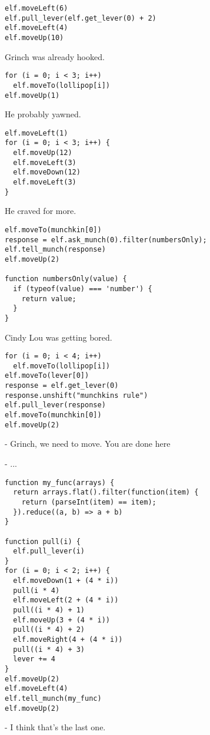 \begin{verbatim}
elf.moveLeft(6)
elf.pull_lever(elf.get_lever(0) + 2)
elf.moveLeft(4)
elf.moveUp(10)
\end{verbatim}

Grinch was already hooked.

\begin{verbatim}
for (i = 0; i < 3; i++)
  elf.moveTo(lollipop[i])
elf.moveUp(1)
\end{verbatim}

He probably yawned.

\begin{verbatim}
elf.moveLeft(1)
for (i = 0; i < 3; i++) {
  elf.moveUp(12)
  elf.moveLeft(3)
  elf.moveDown(12)
  elf.moveLeft(3)
}
\end{verbatim}

He craved for more.

\begin{verbatim}
elf.moveTo(munchkin[0])
response = elf.ask_munch(0).filter(numbersOnly);
elf.tell_munch(response)
elf.moveUp(2)

function numbersOnly(value) {
  if (typeof(value) === 'number') {
    return value;
  }
}
\end{verbatim}

Cindy Lou was getting bored.

\begin{verbatim}
for (i = 0; i < 4; i++)
  elf.moveTo(lollipop[i])
elf.moveTo(lever[0])
response = elf.get_lever(0)
response.unshift("munchkins rule")
elf.pull_lever(response)
elf.moveTo(munchkin[0])
elf.moveUp(2)
\end{verbatim}

- Grinch, we need to move. You are done here

- ...

\begin{verbatim}
function my_func(arrays) {
  return arrays.flat().filter(function(item) {
    return (parseInt(item) == item);
  }).reduce((a, b) => a + b)
}

function pull(i) {
  elf.pull_lever(i)
}
for (i = 0; i < 2; i++) {
  elf.moveDown(1 + (4 * i))
  pull(i * 4)
  elf.moveLeft(2 + (4 * i))
  pull((i * 4) + 1)
  elf.moveUp(3 + (4 * i))
  pull((i * 4) + 2)
  elf.moveRight(4 + (4 * i))
  pull((i * 4) + 3)
  lever += 4
}
elf.moveUp(2)
elf.moveLeft(4)
elf.tell_munch(my_func)
elf.moveUp(2)
\end{verbatim}

- I think that's the last one.

